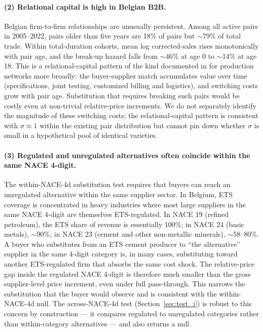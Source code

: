 \paragraph{(2) Relational capital is high in Belgian B2B.} Belgian firm-to-firm relationships are unusually persistent. Among all active pairs in 2005--2022, pairs older than five years are 18\% of pairs but $\sim$79\% of total trade. Within total-duration cohorts, mean log corrected-sales rises monotonically with pair age, and the break-up hazard falls from $\sim$46\% at age 0 to $\sim$14\% at age 18. This is a relational-capital pattern of the kind documented in \citet{baqaee2019} for production networks more broadly: the buyer-supplier match accumulates value over time (specifications, joint testing, customized billing and logistics), and switching costs grow with pair age. Substitution that requires breaking such pairs would be costly even at non-trivial relative-price increments. We do not separately identify the magnitude of these switching costs; the relational-capital pattern is consistent with $\sigma \approx 1$ within the existing pair distribution but cannot pin down whether $\sigma$ is small in a hypothetical pool of identical varieties.

\paragraph{(3) Regulated and unregulated alternatives often coincide within the same NACE 4-digit.} The within-NACE-4d substitution test requires that buyers can reach an unregulated alternative within the same supplier sector. In Belgium, ETS coverage is concentrated in heavy industries where most large suppliers in the same NACE 4-digit are themselves ETS-regulated. In NACE 19 (refined petroleum), the ETS share of revenue is essentially 100\%; in NACE 24 (basic metals), $\sim$90\%; in NACE 23 (cement and other non-metallic minerals), $\sim$58--80\%. A buyer who substitutes from an ETS cement producer to ``the alternative'' supplier in the same 4-digit category is, in many cases, substituting toward another ETS-regulated firm that absorbs the same cost shock. The relative-price gap inside the regulated NACE 4-digit is therefore much smaller than the gross supplier-level price increment, even under full pass-through. This narrows the substitution that the buyer would observe and is consistent with the within-NACE-4d null. The across-NACE-4d test (Section~\ref{sec:test_i}) is robust to this concern by construction --- it compares regulated to unregulated categories rather than within-category alternatives --- and also returns a null.

